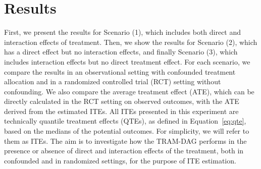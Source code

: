 










% 

 


\section{Results}

First, we present the results for Scenario (1), which includes both direct and interaction effects  of treatment. Then, we show the results for Scenario (2), which has a direct effect but no interaction effects, and finally Scenario (3), which includes interaction effects but no direct treatment effect. For each scenario, we compare the results in an observational setting with confounded treatment allocation and in a randomized controlled trial (RCT) setting without confounding. We also compare the average treatment effect (ATE), which can be directly calculated in the RCT setting on observed outcomes, with the ATE derived from the estimated ITEs. All ITEs presented in this experiment are technically quantile treatment effects (QTEs), as defined in Equation~\ref{eq:qte}, based on the medians of the potential outcomes. For simplicity, we will refer to them as ITEs. The aim is to investigate how the TRAM-DAG performs in the presence or absence of direct and interaction effects of the treatment, both in confounded and in randomized settings, for the purpose of ITE estimation.

